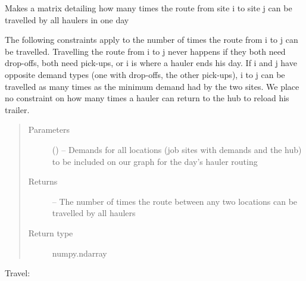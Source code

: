 \documentclass[letterpaper,10pt,english]{sphinxmanual}
\begin{document}
\begin{fulllineitems}
\label{\detokenize{daily-routing:parameters.make_route_constraints}}
Makes a matrix detailing how many times the route from site i to site j
can be travelled by all haulers in one day

The following constraints apply to the number of times the route from i to j
can be travelled. Travelling the route from i to j never happens if they both
need drop-offs, both need pick-ups, or i is where a hauler ends his day. If
i and j have opposite demand types (one with drop-offs, the other pick-ups),
i to j can be travelled as many times as the minimum demand had by the two
sites. We place no constraint on how many times a hauler can return to the
hub to reload his trailer.
\begin{quote}\begin{description}
\item[{Parameters}] \leavevmode
{} () -- Demands for all locations (job sites with demands and the hub) to be
included on our graph for the day's hauler routing

\item[{Returns}] \leavevmode
{} -- The number of times the route between any two locations can be
travelled by all haulers

\item[{Return type}] \leavevmode
numpy.ndarray

\end{description}\end{quote}

\end{fulllineitems}


Travel:
\end{document}

